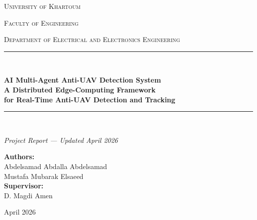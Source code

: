 \documentclass[12pt,a4paper]{report}
\begin{document}
\begin{titlepage}
  \centering
  \vspace*{2cm}
  {\scshape\LARGE University of Khartoum \par}
  \vspace{0.4cm}
  {\scshape\large Faculty of Engineering \par}
  \vspace{0.2cm}
  {\scshape\large Department of Electrical and Electronics Engineering \par}
  \vspace{3cm}
  \rule{\linewidth}{0.5mm}\\[0.4cm]
  {\huge\bfseries AI Multi-Agent Anti-UAV Detection System\\[0.4cm]
    A Distributed Edge-Computing Framework\\[0.3cm]
    for Real-Time Anti-UAV Detection and Tracking\par}
  \rule{\linewidth}{0.5mm}\\[1.5cm]
  \vspace{1cm}
  {\Large\itshape Project Report --- Updated April 2026\par}
  \vspace{2cm}
  {\large
    \textbf{Authors:}\\[0.3cm]
    Abdelsamad Abdalla Abdelsamad\\
    Mustafa Mubarak Elsaeed\\[0.5cm]
    \textbf{Supervisor:}\\[0.3cm]
    D. Magdi Amen\\[1cm]
  }
  \vfill
  {\large April 2026\par}
\end{titlepage}

\tableofcontents
\newpage
\end{document}
